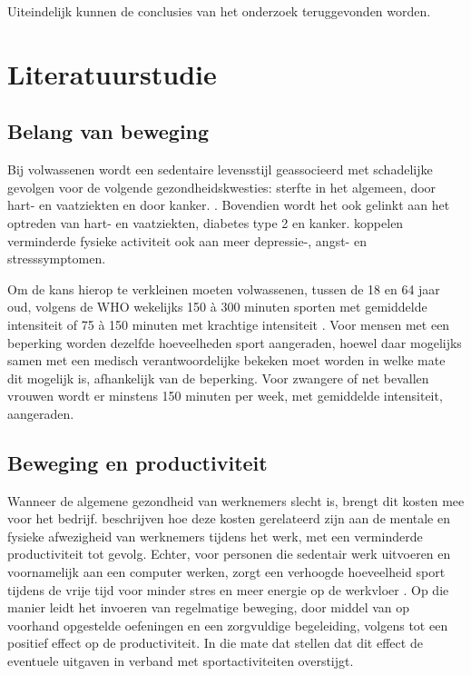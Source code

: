 Uiteindelijk kunnen de conclusies van het onderzoek teruggevonden worden.



\section{Literatuurstudie}%
\label{sec:state-of-the-art}

\subsection{Belang van beweging}

Bij volwassenen wordt een sedentaire levensstijl geassocieerd met schadelijke gevolgen voor de volgende gezondheidskwesties: sterfte in het algemeen, door hart- en vaatziekten en door kanker. \autocite{Bull2020}. Bovendien wordt het ook gelinkt aan het optreden van hart- en vaatziekten, diabetes type 2 en kanker. \textcite{Stanton2020} koppelen verminderde fysieke activiteit ook aan meer depressie-, angst- en stresssymptomen.

Om de kans hierop te verkleinen moeten volwassenen, tussen de 18 en 64 jaar oud, volgens de WHO wekelijks 150 à 300 minuten sporten met gemiddelde intensiteit of 75 à 150 minuten met krachtige intensiteit \autocite{Bull2020}. Voor mensen met een beperking worden dezelfde hoeveelheden sport aangeraden, hoewel daar mogelijks samen met een medisch verantwoordelijke bekeken moet worden in welke mate dit mogelijk is, afhankelijk van de beperking. Voor zwangere of net bevallen vrouwen wordt er minstens 150 minuten per week, met gemiddelde intensiteit, aangeraden.

\subsection{Beweging en productiviteit}

Wanneer de algemene gezondheid van werknemers slecht is, brengt dit kosten mee voor het bedrijf. \textcite{Sjoegaard2016} beschrijven hoe deze kosten gerelateerd zijn aan de mentale en fysieke afwezigheid van werknemers tijdens het werk, met een verminderde productiviteit tot gevolg. Echter, voor personen die sedentair werk uitvoeren en voornamelijk aan een computer werken, zorgt een verhoogde hoeveelheid sport tijdens de vrije tijd voor minder stres en meer energie op de werkvloer \autocite{Hansen2009}. Op die manier leidt het invoeren van regelmatige beweging, door middel van op voorhand opgestelde oefeningen en een zorgvuldige begeleiding, volgens \textcite{Cancelliere2011} tot een positief effect op de productiviteit. In die mate dat \textcite{Sjoegaard2016} stellen dat dit effect de eventuele uitgaven in verband met sportactiviteiten overstijgt.

